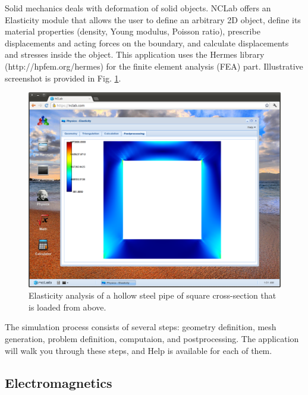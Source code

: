 \documentclass[article,A4,12pt]{llncs}
\begin{document}
Solid mechanics deals with deformation of solid objects. NCLab 
offers an Elasticity module that allows the user to define an
arbitrary 2D object, define its material properties (density, Young modulus, 
Poisson ratio), prescribe displacements and acting forces on the boundary, 
and calculate displacements and stresses inside the object. This application  
uses the Hermes library (http://hpfem.org/hermes) for the finite element 
analysis (FEA) part. Illustrative screenshot is provided in Fig. \ref{fig:elast1}.
\newpage
\begin{figure}[!ht]
\begin{center}
\includegraphics[width=\textwidth]{img/elast1.png}
\end{center}
\caption{Elasticity analysis of a hollow steel pipe of square cross-section that is loaded from above.}
\label{fig:elast1}
\end{figure}
\noindent
The simulation process consists of several steps: geometry definition, 
mesh generation, problem definition, computaion, and postprocessing. 
The application will walk you through these steps, and Help 
is available for each of them.

\subsection{Electromagnetics}
\end{document}
